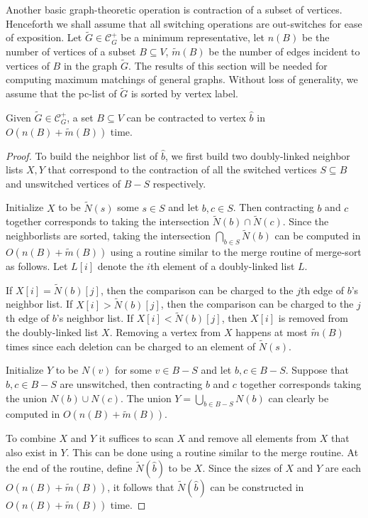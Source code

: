 \documentclass{llncs}
\begin{document}
\noindent Another basic graph-theoretic operation is contraction of a subset of vertices.  Henceforth we shall assume that all switching operations are out-switches for ease of exposition.  Let $\widetilde{G} \in \mathcal{C}_G^+$ be a minimum representative, let $n(B)$ be the number of vertices of a subset $B \subseteq V$, $\widetilde{m}(B)$ be the number of edges incident to vertices of $B$ in the graph $\widetilde{G}$.  The results of this section will be needed for computing maximum matchings of general graphs.  Without loss of generality, we assume that the pc-list of $\widetilde{G}$ is sorted by vertex label.

\begin{lemma}\label{lem:contract}
Given $\widetilde{G} \in \mathcal{C}_G^+$, a set $B \subseteq V$ can be contracted to vertex $\hat{b}$ in $O(n(B)+\widetilde{m}(B))$ time.
\end{lemma}
\begin{proof}
To build the neighbor list of $\hat{b}$, we first build two doubly-linked neighbor lists $X,Y$ that correspond to the contraction of all the switched vertices $S \subseteq B$ and unswitched vertices of $B-S$ respectively.

Initialize $X$ to be $\widetilde{N}(s)$ some $s \in S$ and let $b,c \in S$.  Then contracting $b$ and $c$ together corresponds to taking the intersection $\widetilde{N}(b) \cap \widetilde{N}(c)$.  Since the neighborlists are sorted, taking the intersection $\bigcap_{b \in S} \widetilde{N}(b)$ can be computed in $O(n(B)+\widetilde{m}(B))$ using a routine similar to the merge routine of merge-sort as follows.  Let $L[i]$ denote the $i$th element of a doubly-linked list $L$.

If $X[i] = \widetilde{N}(b)[j]$, then the comparison can be charged to the $j$th edge of $b$'s neighbor list.  If $X[i] > \widetilde{N}(b)[j]$, then the comparison can be charged to the $j$th edge of $b$'s neighbor list.  If $X[i] < \widetilde{N}(b)[j]$, then $X[i]$ is removed from the doubly-linked list $X$.  Removing a vertex from $X$ happens at most $\widetilde{m}(B)$ times since each deletion can be charged to an element of $\widetilde{N}(s)$.  

Initialize $Y$ to be $N(v)$ for some $v \in B-S$ and let $b,c \in B-S$. Suppose that $b,c \in B-S$ are unswitched, then contracting $b$ and $c$ together corresponds taking the union $N(b) \cup N(c)$.  The union $Y = \bigcup_{b \in B-S} N(b)$ can clearly be computed in $O(n(B)+\widetilde{m}(B))$.

To combine $X$ and $Y$ it suffices to scan $X$ and remove all elements from $X$ that also exist in $Y$. This can be done using a routine similar to the merge routine.  At the end of the routine, define $\widetilde{N}(\hat{b})$ to be $X$.  Since the sizes of $X$ and $Y$ are each $O(n(B) + \widetilde{m}(B))$, it follows that $\widetilde{N}(\hat{b})$ can be constructed in $O(n(B) + \widetilde{m}(B))$ time.
\end{proof}
\end{document}
